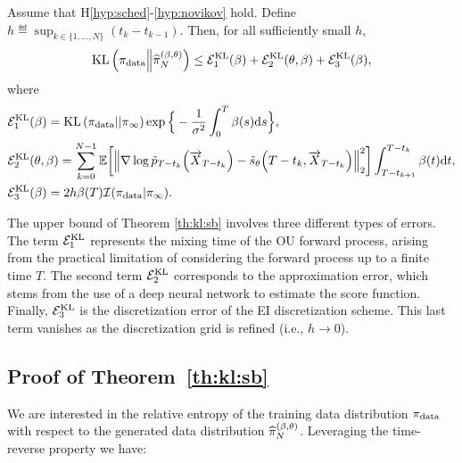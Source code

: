 \documentclass[english,graybox,envcountchap,envcountsame,sectrefs,shortlabels]{svmono}
\theoremstyle{style}
\newcommand{\eqsp}{}
\begin{document}
\begin{theorem}
\label{th:kl:sb}
Assume that H\ref{hyp:sched}-\ref{hyp:novikov} hold. Define $h \eqdef \sup_{k \in \{1 , \ldots , N \} } (t_{k}-t_{k-1})$. Then, for all sufficiently small $h$,
\begin{equation*}
{\rm KL}\left( \pi_{\rm data} \middle\| \pihat  \right) \leq \mathcal{E}_1^{\rm KL}(\sched) + \mathcal{E}_2^{\rm KL}(\param,\sched) + \mathcal{E}_3^{\rm KL}(\sched)\eqsp,
\end{equation*}
where 
\begin{align*}
    &\mathcal{E}_1^{\rm KL}(\sched) = {\rm KL}\left( \pi_{\rm data} \middle|\middle| \pi_\infty  \right)  \exp\Big\{- \frac{1}{\sigma^2} \int_0^T \sched(s) \rmd s\Big\}\eqsp,\\
    &\mathcal{E}_2^{\rm KL}(\param,\sched) = \sum_{k = 0}^{N-1}  \mathbb{E} \bigg[  \Big\|   \nabla \log \tilde p_{T-t_k}\Big(\overrightarrow X_{T-t_k}\Big)  - \tilde s_{\param}\Big(T-t_k,  \overrightarrow X_{T-t_k}\Big) \Big\|_2^2 \bigg]
    \int^{T-t_k}_{T-t_{k+1}} \sched (t) \rmd t\eqsp,\\
    &\mathcal{E}_3^{\rm KL}(\sched) = 2 h  \sched (T) \mathcal{I}(\pi_{\rm data} | \pi_{\infty} )\eqsp.
\end{align*}
\end{theorem}
The upper bound of Theorem \ref{th:kl:sb} involves  three different types of errors. The term $\mathcal{E}_1^{\rm KL}$ represents the mixing time of the OU forward process, 
arising from the practical limitation of considering the forward process up to a finite time $T$. 
The second term $\mathcal{E}_2^{\rm KL}$   corresponds to the approximation error, which stems from the use of a deep neural network to estimate the score function.  Finally, $\mathcal{E}_3^{\rm KL}$ is the  discretization error of the EI discretization scheme. This last term vanishes as the discretization grid is refined (i.e., $h\to 0$).

\subsection{Proof of Theorem~\ref{th:kl:sb}}
We are interested in the relative entropy of the training data distribution $\pi_{\rm data}$ with respect to the generated data distribution $ \widehat{\pi}_N^{(\beta,\theta)} $. Leveraging the time-reverse property we have:
\end{document}
